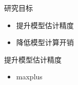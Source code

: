 \begin{frame}
\begin{columns}[t]
\begin{column}{0.5\textwidth}
\begin{block}{研究目标}
				\begin{itemize}
					\item 提升模型估计精度
					\item 降低模型计算开销
				\end{itemize}
			\end{block}
			\begin{block}{提升模型估计精度}
				\begin{itemize}
					\item maxplus
				\end{itemize}
			\end{block}
		\end{column}
	\end{columns}
\end{frame}
